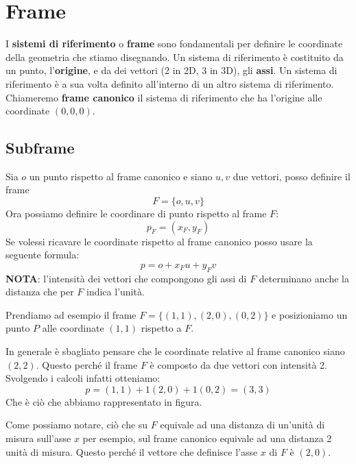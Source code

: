 \chapter{Frame}
I \textbf{sistemi di riferimento} o \textbf{frame} sono fondamentali per definire le coordinate
della geometria che stiamo disegnando. Un sistema di riferimento \`e costituito da un punto,
l'\textbf{origine}, e da dei vettori (2 in 2D, 3 in 3D), gli \textbf{assi}.
Un sistema di riferimento \`e a sua volta definito all'interno di un altro sistema di
riferimento. Chiameremo \textbf{frame canonico} il sistema di riferimento che
ha l'origine alle coordinate $(0, 0, 0)$.

\section{Subframe}
Sia $o$ un punto rispetto al frame canonico e siano $u, v$ due vettori, posso definire il frame
\[ F = \{ o, u, v \} \]
Ora possiamo definire le coordinare di punto rispetto al frame $F$:
\[ p_F = (x_F, y_F) \]
Se volessi ricavare le coordinate rispetto al frame canonico posso usare la seguente formula:
\[ p = o + x_Fu + y_Fv \]
\textbf{NOTA}: l'intensit\`a dei vettori che compongono gli assi di $F$ determinano anche
la distanza che per $F$ indica l'unit\`a.

\begin{example}
	Prendiamo ad esempio il frame $F = \{ (1, 1), (2, 0), (0, 2) \}$ e posizioniamo un punto $P$
	alle coordinate $(1, 1)$ rispetto a $F$.
	\begin{center}
	\end{center}
	In generale \`e sbagliato pensare che le coordinate relative al frame canonico siano
	$(2, 2)$. Questo perch\'e il frame $F$ \`e composto da due vettori con intensit\`a 2.
	Svolgendo i calcoli infatti otteniamo:
	\[ p = (1, 1) + 1 (2, 0) + 1 (0, 2) = (3, 3) \]
	Che \`e ci\`o che abbiamo rappresentato in figura.

	Come possiamo notare, ci\`o che su $F$ equivale ad una distanza di un'unit\`a di misura
	sull'asse $x$ per esempio, sul frame canonico equivale ad una distanza 2 unit\`a di misura.
	Questo perch\'e il vettore che definisce l'asse $x$ di $F$ \`e $(2, 0)$.
\end{example}

